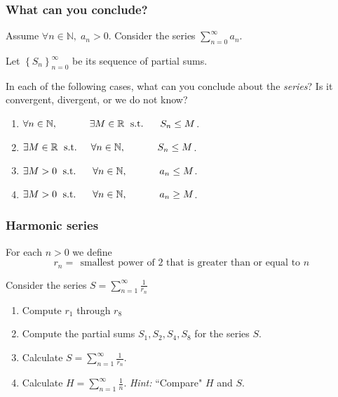 \documentclass[14pt]{beamer}
\begin{document}
\begin{frame}[t]
	\fontsize{13}{13}\selectfont
	\frametitle{What can you conclude?}

	Assume $\displaystyle \forall n \in \mathbb{N}, \; a_{n}>0$. Consider the
	series $\displaystyle \sum_{n=0}^{\infty}a_{n}$.

	Let $\displaystyle \left\{ S_{n}\right\}_{n=0}^{\infty}$ be its sequence of
	partial sums.
	\vspace{.5cm}

	In each of the following cases, what can you conclude about the \emph{series}?
	Is it convergent, divergent, or we do not know?
	\vspace{.5cm}

	\begin{enumerate}
		\item $\displaystyle \forall n \in \mathbb{N}, \; \text{ \phantom{s.t.} }\quad
			\exists M \in \mathbb{R}\; \text{ s.t. }\; \quad S_{n}\leq M$.

		\item $\displaystyle \exists M \in \mathbb{R}\; \text{ s.t. }\quad \forall n
			\in \mathbb{N}, \; \text{ \phantom{s.t.} }\quad S_{n}\leq M$.

		\item $\displaystyle \exists M >0 \; \text{ s.t. }\; \quad \forall n \in \mathbb{N}
			, \; \text{ \phantom{s.t.} }\quad a_{n}\leq M$.

		\item $\displaystyle \exists M >0 \; \text{ s.t. }\; \quad \forall n \in \mathbb{N}
			, \; \text{ \phantom{s.t.} }\quad a_{n}\geq M$.
	\end{enumerate}
\end{frame}

\begin{frame}[t]
	\fontsize{13}{13}\selectfont
	\frametitle{Harmonic series}

	For each $n >0$ we define
	\[
		r_{n}= \; \, \text{smallest power of $2$ that is greater than or equal to
		$n$}\,
	\]
	\vspace{-.7cm}

	Consider the series $\displaystyle S = \sum_{n=1}^{\infty}\frac{1}{r_{n}}$
	\vspace{.2cm}

	\begin{enumerate}
		\item Compute $\displaystyle r_{1}$ through $\displaystyle r_{8}$
			\vspace{.5cm}

		\item Compute the partial sums $\displaystyle S_{1}, S_{2}, S_{4}, S_{8}$ for
			the series $S$.
			\vspace{.2cm}

		\item Calculate $\displaystyle S = \sum_{n=1}^{\infty}\frac{1}{r_{n}}$.

		\item Calculate $\displaystyle H = \sum_{n=1}^{\infty}\frac{1}{n}$. \hfill
			\emph{Hint:} ``Compare" $H$ and $S$.
	\end{enumerate}
\end{frame}
\end{document}
